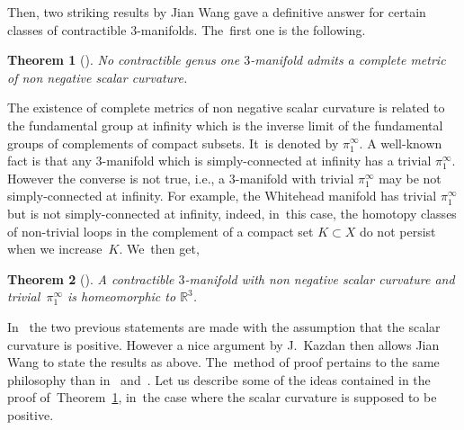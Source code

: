 \documentclass[pdftex]{sigma}
\numberwithin{equation}{section}
\newtheorem{theor}{Theorem}[section]
\begin{document}
Then, two striking results by Jian Wang gave a definitive answer for certain classes of contractible $3$-manifolds. The~first one is the following.

\begin{theor}[\cite{Wang1}]\label{Wang1}
No contractible genus one $3$-manifold admits a complete metric of non negative scalar curvature.
\end{theor}

The existence of complete metrics of non negative scalar curvature is related to the fundamental group at infinity which is the inverse limit of the fundamental groups of complements of compact subsets. It~is denoted by $\pi_1^{\infty}$. A well-known fact is that any $3$-manifold which is simply-connected at infinity has a trivial $\pi^\infty_1$. However the converse is not true, i.e., a $3$-manifold with trivial $\pi_{1}^{\infty}$ may be not simply-connected at infinity. For example, the Whitehead manifold has trivial $\pi_{1}^{\infty}$ but is not simply-connected at infinity, indeed, in~this case, the homotopy classes of non-trivial loops in
the complement of a compact set $K\subset X$ do not persist when we increase~$K$. We~then get,

\begin{theor}[\cite{Wang2}]\label{Wang2}
A contractible $3$-manifold with non negative scalar curvature and trivial~$\pi_1^{\infty}$ is homeomorphic to $\mathbb{R}^{3}$.
\end{theor}

In~\cite{Wang1, Wang2} the two previous statements are made with the assumption that the scalar curvature is positive. However a nice argument by J.~Kazdan then allows Jian Wang to state the results as above. The~method
of proof pertains to the same philosophy than in~\cite{SchoenYau:stable} and~\cite{GromovLawson}. Let us describe some of the ideas contained in the proof of~Theorem~\ref{Wang1}, in~the case where the scalar curvature is supposed to be positive.
\end{document}
